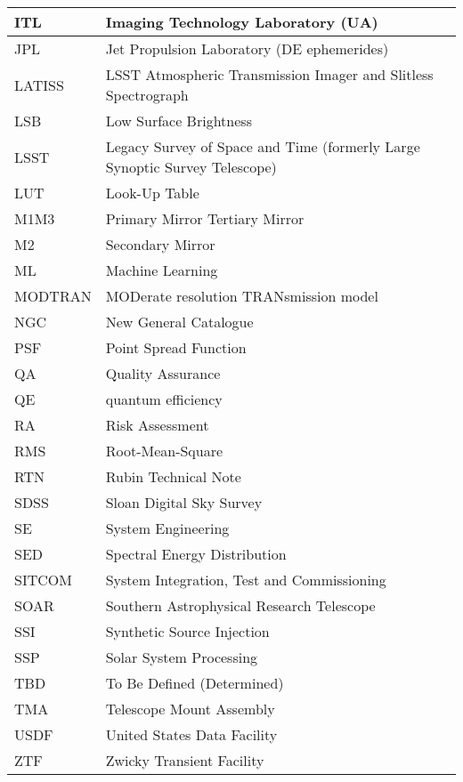 \begin{longtable}{p{}p{}}
ITL & Imaging Technology Laboratory (UA) \\\hline
JPL & Jet Propulsion Laboratory (DE ephemerides) \\\hline
LATISS & LSST Atmospheric Transmission Imager and Slitless Spectrograph \\\hline
LSB & Low Surface Brightness \\\hline
LSST & Legacy Survey of Space and Time (formerly Large Synoptic Survey Telescope) \\\hline
LUT & Look-Up Table \\\hline
M1M3 & Primary Mirror Tertiary Mirror \\\hline
M2 & Secondary Mirror \\\hline
ML & Machine Learning \\\hline
MODTRAN & MODerate resolution TRANsmission model \\\hline
NGC & New General Catalogue \\\hline
PSF & Point Spread Function \\\hline
QA & Quality Assurance \\\hline
QE & quantum efficiency \\\hline
RA & Risk Assessment \\\hline
RMS & Root-Mean-Square \\\hline
RTN & Rubin Technical Note \\\hline
SDSS & Sloan Digital Sky Survey \\\hline
SE & System Engineering \\\hline
SED & Spectral Energy Distribution \\\hline
SITCOM & System Integration, Test and Commissioning \\\hline
SOAR & Southern Astrophysical Research Telescope \\\hline
SSI & Synthetic Source Injection \\\hline
SSP & Solar System Processing \\\hline
TBD & To Be Defined (Determined) \\\hline
TMA & Telescope Mount Assembly \\\hline
USDF & United States Data Facility \\\hline
ZTF & Zwicky Transient Facility \\\hline
\end{longtable}

